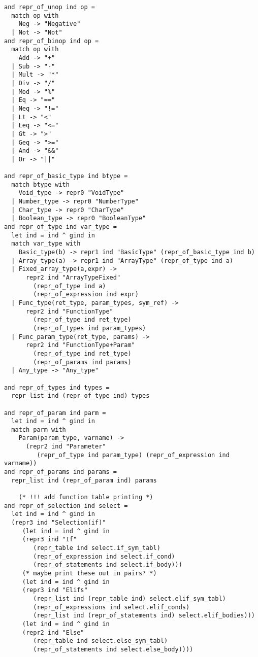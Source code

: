 \begin{verbatim}
and repr_of_unop ind op =
  match op with
    Neg -> "Negative"
  | Not -> "Not"
and repr_of_binop ind op =
  match op with
    Add -> "+"
  | Sub -> "-"
  | Mult -> "*"
  | Div -> "/"
  | Mod -> "%"
  | Eq -> "=="
  | Neq -> "!="
  | Lt -> "<"
  | Leq -> "<="
  | Gt -> ">"
  | Geq -> ">="
  | And -> "&&"
  | Or -> "||"

and repr_of_basic_type ind btype =
  match btype with
    Void_type -> repr0 "VoidType"
  | Number_type -> repr0 "NumberType"
  | Char_type -> repr0 "CharType"
  | Boolean_type -> repr0 "BooleanType"
and repr_of_type ind var_type =
  let ind = ind ^ gind in
  match var_type with
    Basic_type(b) -> repr1 ind "BasicType" (repr_of_basic_type ind b)
  | Array_type(a) -> repr1 ind "ArrayType" (repr_of_type ind a)
  | Fixed_array_type(a,expr) ->
      repr2 ind "ArrayTypeFixed"
        (repr_of_type ind a)
        (repr_of_expression ind expr)
  | Func_type(ret_type, param_types, sym_ref) ->
      repr2 ind "FunctionType"
        (repr_of_type ind ret_type)
        (repr_of_types ind param_types)
  | Func_param_type(ret_type, params) ->
      repr2 ind "FunctionType+Param"
        (repr_of_type ind ret_type)
        (repr_of_params ind params)
  | Any_type -> "Any_type"

and repr_of_types ind types =
  repr_list ind (repr_of_type ind) types

and repr_of_param ind parm =
  let ind = ind ^ gind in
  match parm with
    Param(param_type, varname) ->
      (repr2 ind "Parameter"
         (repr_of_type ind param_type) (repr_of_expression ind varname))
and repr_of_params ind params =
  repr_list ind (repr_of_param ind) params

    (* !!! add function table printing *)
and repr_of_selection ind select =
  let ind = ind ^ gind in
  (repr3 ind "Selection(if)"
     (let ind = ind ^ gind in
     (repr3 ind "If"
        (repr_table ind select.if_sym_tabl)
        (repr_of_expression ind select.if_cond)
        (repr_of_statements ind select.if_body)))
     (* maybe print these out in pairs? *)
     (let ind = ind ^ gind in
     (repr3 ind "Elifs"
        (repr_list ind (repr_table ind) select.elif_sym_tabl)
        (repr_of_expressions ind select.elif_conds)
        (repr_list ind (repr_of_statements ind) select.elif_bodies)))
     (let ind = ind ^ gind in
     (repr2 ind "Else"
        (repr_table ind select.else_sym_tabl)
        (repr_of_statements ind select.else_body))))


\end{verbatim}
